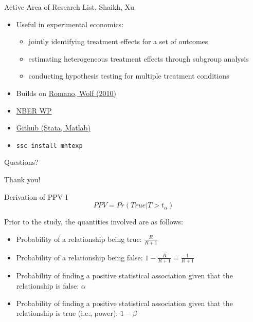 \documentclass{beamer}
\begin{document}
\begin{frame}{Active Area of Research}
List, Shaikh, Xu
\begin{itemize}
\item Useful in experimental economics:
\begin{itemize}
\item jointly identifying treatment effects for a set of outcomes
\item estimating heterogeneous treatment effects through subgroup analysis
\item conducting hypothesis testing for multiple treatment conditions
\end{itemize}
\item Builds on \href{https://projecteuclid.org/download/pdfview_1/euclid.aos/1262271625}{Romano, Wolf (2010)}
\item \href{http://www.nber.org/papers/w21875}{NBER WP}
\item \href{https://github.com/seidelj/mht}{Github (Stata, Matlab)}
\item \texttt{ssc install mhtexp}
\end{itemize}
\end{frame}

\begin{frame}
\begin{center}
Questions?
\vspace{1in}


\Huge{Thank you!}
\end{center}
\end{frame}



\begin{frame}[label=derive]{Derivation of PPV I}
\[PPV = Pr(True|T > t_{\alpha})\]

Prior to the study, the quantities involved are as follows:

\begin{itemize}
\item
  Probability of a relationship being true: \(\frac{R}{R + 1}\)
\item
  Probability of a relationship being false:
  \(1 - \frac{R}{R + 1} = \frac{1}{R + 1}\)
\item
  Probability of finding a positive statistical association given that
  the relationship is false: \(\alpha\)
\item
  Probability of finding a positive statistical association given that
  the relationship is true (i.e., power): \(1 - \beta\)
\end{itemize}
\end{frame}
\end{document}
